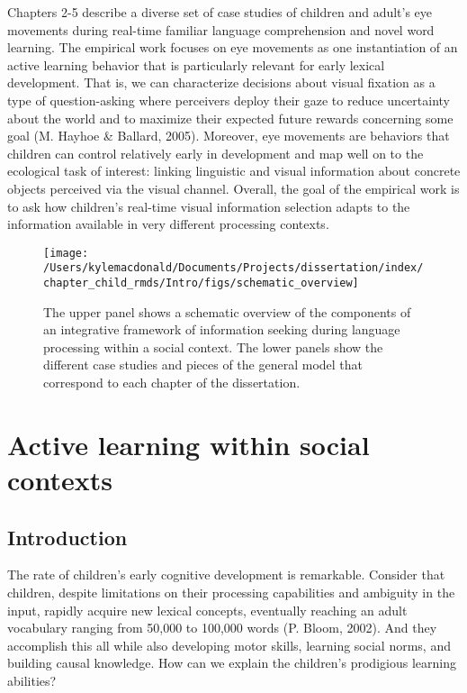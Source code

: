 \documentclass[oneside]{report}
\begin{document}
Chapters 2-5 describe a diverse set of case studies of children and
adult's eye movements during real-time familiar language comprehension
and novel word learning. The empirical work focuses on eye movements as
one instantiation of an active learning behavior that is particularly
relevant for early lexical development. That is, we can characterize
decisions about visual fixation as a type of question-asking where
perceivers deploy their gaze to reduce uncertainty about the world and
to maximize their expected future rewards concerning some goal (M.
Hayhoe \& Ballard, 2005). Moreover, eye movements are behaviors that
children can control relatively early in development and map well on to
the ecological task of interest: linking linguistic and visual
information about concrete objects perceived via the visual channel.
Overall, the goal of the empirical work is to ask how children's
real-time visual information selection adapts to the information
available in very different processing contexts.
\begin{figure}[t]

{\centering \texttt{[image: /Users/kylemacdonald/Documents/Projects/dissertation/index/chapter\_child\_rmds/Intro/figs/schematic\_overview]} 

}

\caption[Schematic overview of the dissertation content.]{The upper panel shows a schematic overview of the components of an integrative framework of information seeking during language processing within a social context. The lower panels show the different case studies and pieces of the general model that correspond to each chapter of the dissertation.}\label{fig:schematic-overview}
\end{figure}
\chapter{Active learning within social
contexts}\label{active-learning-within-social-contexts}

\section{Introduction}\label{introduction}

The rate of children's early cognitive development is remarkable.
Consider that children, despite limitations on their processing
capabilities and ambiguity in the input, rapidly acquire new lexical
concepts, eventually reaching an adult vocabulary ranging from 50,000 to
100,000 words (P. Bloom, 2002). And they accomplish this all while also
developing motor skills, learning social norms, and building causal
knowledge. How can we explain the children's prodigious learning
abilities?
\end{document}
